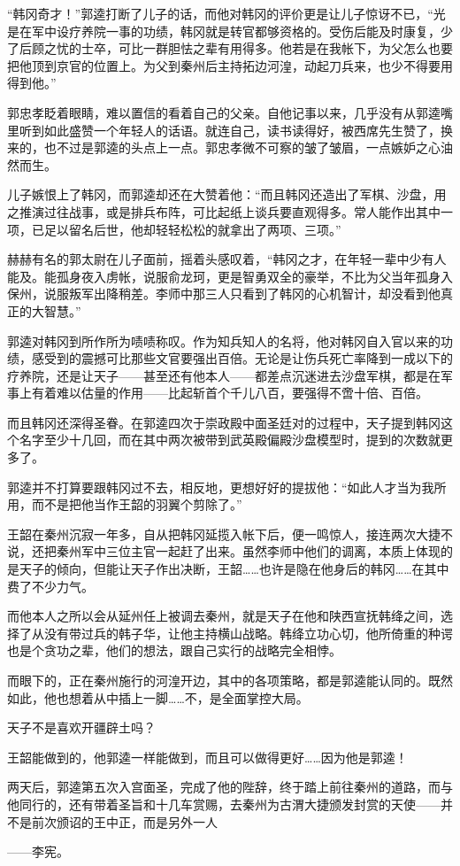 “韩冈奇才！”郭逵打断了儿子的话，而他对韩冈的评价更是让儿子惊讶不已，“光是在军中设疗养院一事的功绩，韩冈就是转官都够资格的。受伤后能及时康复，少了后顾之忧的士卒，可比一群胆怯之辈有用得多。他若是在我帐下，为父怎么也要把他顶到京官的位置上。为父到秦州后主持拓边河湟，动起刀兵来，也少不得要用得到他。”

郭忠孝眨着眼睛，难以置信的看着自己的父亲。自他记事以来，几乎没有从郭逵嘴里听到如此盛赞一个年轻人的话语。就连自己，读书读得好，被西席先生赞了，换来的，也不过是郭逵的头点上一点。郭忠孝微不可察的皱了皱眉，一点嫉妒之心油然而生。

儿子嫉恨上了韩冈，而郭逵却还在大赞着他：“而且韩冈还造出了军棋、沙盘，用之推演过往战事，或是排兵布阵，可比起纸上谈兵要直观得多。常人能作出其中一项，已足以留名后世，他却轻轻松松的就拿出了两项、三项。”

赫赫有名的郭太尉在儿子面前，摇着头感叹着，“韩冈之才，在年轻一辈中少有人能及。能孤身夜入虏帐，说服俞龙珂，更是智勇双全的豪举，不比为父当年孤身入保州，说服叛军出降稍差。李师中那三人只看到了韩冈的心机智计，却没看到他真正的大智慧。”

郭逵对韩冈到所作所为啧啧称叹。作为知兵知人的名将，他对韩冈自入官以来的功绩，感受到的震撼可比那些文官要强出百倍。无论是让伤兵死亡率降到一成以下的疗养院，还是让天子——甚至还有他本人——都差点沉迷进去沙盘军棋，都是在军事上有着难以估量的作用——比起斩首个千儿八百，要强得不啻十倍、百倍。

而且韩冈还深得圣眷。在郭逵四次于崇政殿中面圣廷对的过程中，天子提到韩冈这个名字至少十几回，而在其中两次被带到武英殿偏殿沙盘模型时，提到的次数就更多了。

郭逵并不打算要跟韩冈过不去，相反地，更想好好的提拔他：“如此人才当为我所用，而不是把他当作王韶的羽翼个剪除了。”

王韶在秦州沉寂一年多，自从把韩冈延揽入帐下后，便一鸣惊人，接连两次大捷不说，还把秦州军中三位主官一起赶了出来。虽然李师中他们的调离，本质上体现的是天子的倾向，但能让天子作出决断，王韶……也许是隐在他身后的韩冈……在其中费了不少力气。

而他本人之所以会从延州任上被调去秦州，就是天子在他和陕西宣抚韩绛之间，选择了从没有带过兵的韩子华，让他主持横山战略。韩绛立功心切，他所倚重的种谔也是个贪功之辈，他们的想法，跟自己实行的战略完全相悖。

而眼下的，正在秦州施行的河湟开边，其中的各项策略，都是郭逵能认同的。既然如此，他也想着从中插上一脚……不，是全面掌控大局。

天子不是喜欢开疆辟土吗？

王韶能做到的，他郭逵一样能做到，而且可以做得更好……因为他是郭逵！

两天后，郭逵第五次入宫面圣，完成了他的陛辞，终于踏上前往秦州的道路，而与他同行的，还有带着圣旨和十几车赏赐，去秦州为古渭大捷颁发封赏的天使——并不是前次颁诏的王中正，而是另外一人

——李宪。

